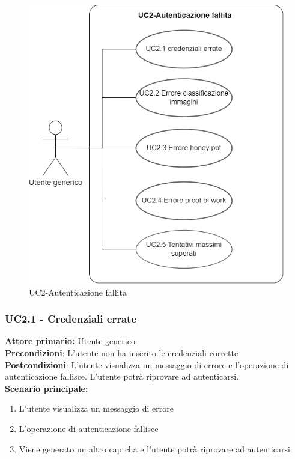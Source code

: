 \begin{figure}[H]
    \centering
    \includegraphics[scale=0.4]{img/Autenticazione_fallita.png}
    \caption{UC2-Autenticazione fallita}
\end{figure}

\subsubsection{UC2.1 - Credenziali errate}
\textbf{Attore primario:} Utente generico\\
\textbf{Precondizioni}: L’utente non ha inserito le credenziali corrette\\
\textbf{Postcondizioni}:  L’utente visualizza un messaggio di errore e l’operazione di autenticazione fallisce. L’utente potrà riprovare  ad autenticarsi.\\

\textbf{Scenario principale}:
\begin{enumerate}
	\item L’utente visualizza un messaggio di errore
	\item L’operazione di autenticazione fallisce
	\item Viene generato un altro captcha e l’utente potrà riprovare ad autenticarsi
\end{enumerate}

